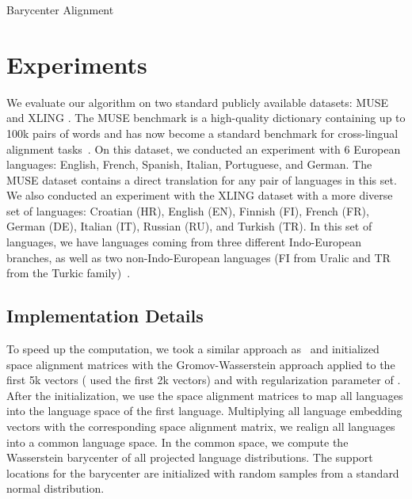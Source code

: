 \documentclass{article}
\begin{document}
\begin{algorithm}[t]

	
	\caption{Barycenter Alignment}
	
	\For{}{
 
		

		
 
		
		 
		
		 
		
		 
	}
	\Return  
	\label{alg:WB}
\end{algorithm} \section{Experiments}
\label{sec:experiments}
We evaluate our algorithm on two standard publicly available datasets: MUSE \cite{LampleCRDJ18} and XLING \cite{glavas-etal-2019-properly}.  The MUSE benchmark is a high-quality dictionary containing up to 100k pairs of words and has now become a standard benchmark for cross-lingual alignment tasks~\cite{LampleCRDJ18}. On this dataset, we conducted an experiment with 6 European languages: English, French, Spanish, Italian, Portuguese, and German. The MUSE dataset contains a direct translation for any pair of languages in this set.
We also conducted an experiment with the XLING dataset with a more diverse set of languages: Croatian (HR), English (EN), Finnish (FI), French (FR), German (DE), Italian (IT), Russian (RU), and Turkish (TR). In this set of languages, we have languages coming from three different Indo-European branches, as well as two non-Indo-European languages (FI from Uralic and TR from the Turkic family)~\cite{glavas-etal-2019-properly}.


\subsection{Implementation Details} 
To speed up the computation, we took a similar approach as~\citet{AlauxGCJ19} and initialized space alignment matrices with the Gromov-Wasserstein approach \cite{AlvarezMelisJaakkola18} applied to the first 5k vectors (\citet{AlauxGCJ19} used the first 2k vectors) and with regularization parameter  of . 
After the initialization, we use the space alignment matrices to map all languages into the language space of the first language. Multiplying all language embedding vectors with the corresponding space alignment matrix, we realign all languages into a common language space.
In the common space, we compute the Wasserstein barycenter of all projected language distributions. The support locations for the barycenter are initialized with random samples from a standard normal distribution.
\end{document}
